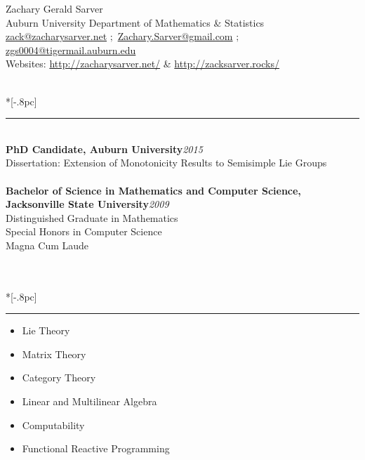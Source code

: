 \documentclass{article}
\begin{document}
\thispagestyle{empty}

\begin{center}
{\Large Zachary Gerald Sarver} \\[.5pc]
Auburn University Department of Mathematics \& Statistics \\
\href{mailto:zack@zacharysarver.net}{zack@zacharysarver.net} $;$
\href{mailto:Zachary.Sarver@gmail.com}{Zachary.Sarver@gmail.com} $;$
\href{mailto:zgs0004@tigermail.auburn.edu}{zgs0004@tigermail.auburn.edu} \\
Websites: \url{http://zacharysarver.net/} \& \url{http://zacksarver.rocks/}
\end{center}

 \\*[-.8pc]
\rule{\textwidth}{.1pt} \\
{\bf PhD Candidate, Auburn University}\hfill {\it 2015} \\
Dissertation: Extension of Monotonicity Results to Semisimple Lie Groups \\
\\
{\bf Bachelor of Science in Mathematics and Computer Science,\\ Jacksonville State
University}\hfill {\it 2009}\\
Distinguished Graduate in Mathematics\\
Special Honors in Computer Science\\
Magna Cum Laude\\

\

 \\*[-.8pc]
\rule{\textwidth}{.1pt} 
\begin{multicols}{2}
\begin{itemize}[noitemsep]
\item Lie Theory
\item Matrix Theory
\item Category Theory
\item Linear and Multilinear Algebra
\item Computability
\item Functional Reactive Programming
\end{itemize}
\end{multicols}
\end{document}
